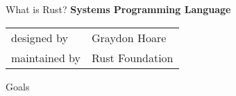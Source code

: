 \begin{frame}{What is Rust?}%
	\centering%
	\textbf{\Large Systems Programming Language}\\[1em]
	\begin{tabular}{ll}
		{\scriptsize\color{gray} designed by}   & {\small  Graydon Hoare}   \\
		{\scriptsize\color{gray} maintained by} & {\small  Rust Foundation} \\
	\end{tabular}%

	\vspace{1cm}%

	\raggedright{\large\color{darkgray} Goals~\supercite{Faq}}\\[1.2em]
	\begin{columns}%
		\raggedleft{}%

		\centering{}%

		\raggedright{}%
	\end{columns}%
\end{frame}%
